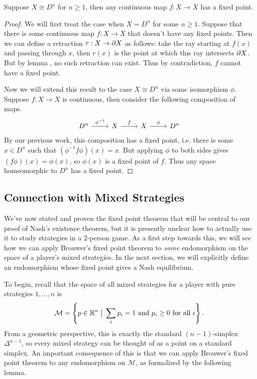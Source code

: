 \documentclass[twoside,10pt]{article}
\begin{document}
\begin{thrm}
	Suppose $X \cong D^{n}$ for $n \geq 1$, then any continuous map $f:X\to X$ has a fixed point.
\end{thrm}
\begin{proof}
	We will first treat the case when $X = D^{n}$ for some $n \geq 1$. Suppose that there is some continuous map $f:X\to X$ that doesn't have any fixed points. Then we can define a retraction $r:X\to \partial X$ as follows: take the ray starting at $f(x)$ and passing through $x$, then $r(x)$ is the point at which this ray intersects $\partial X$. But by lemma , no such retraction can exist. Thus by contradiction, $f$ cannot have a fixed point.

	Now we will extend this result to the case $X \cong D^{n}$ via some isomorphism $\phi$. Suppose $f:X\to X$ is continuous, then consider the following composition of maps.
	\[
	\begin{tikzcd}
		D^{n} \rar{\phi^{-1}} & X \rar{f} & X \rar{\phi} & D^{n}
	\end{tikzcd}
\] By our previous work, this composition has a fixed point, i.e. there is some $x \in D^{n}$ such that $(\phi^{-1}f \phi)(x) = x$. But applying $\phi$ to both sides gives $(f\phi)(x) = \phi(x)$, so $\phi(x)$ is a fixed point of $f$. Thus any space homeomorphic to $D^{n}$ has a fixed point.
\end{proof}

\subsection{Connection with Mixed Strategies}

We've now stated and proven the fixed point theorem that will be central to our proof of Nash's existence theorem, but it is presently unclear how to actually use it to study strategies in a 2-person game. As a first step towards this, we will see how we can apply Brouwer's fixed point theorem to \textit{some} endomorphism on the space of a player's mixed strategies. In the next section, we will explicitly define an endomorphism whose fixed point gives a Nash equilibrium.

To begin, recall that the space of all mixed strategies for a player with pure strategies $1, \dots, n$ is
\[
	\mathcal{M} = \left\{ p \in \mathbb{R}^{n} \;\big|\; \sum_i p_i = 1 \text{ and } p_i \geq 0 \text{ for all } i \right\}.
\] 
From a geometric perspective, this is exactly the standard $(n-1)$-simplex $\Delta^{n-1}$, so every mixed strategy can be thought of as a point on a standard simplex. An important consequence of this is that we can apply Brouwer's fixed point theorem to any endomorphism on $\mathcal{M}$, as formalized by the following lemma.
\end{document}
